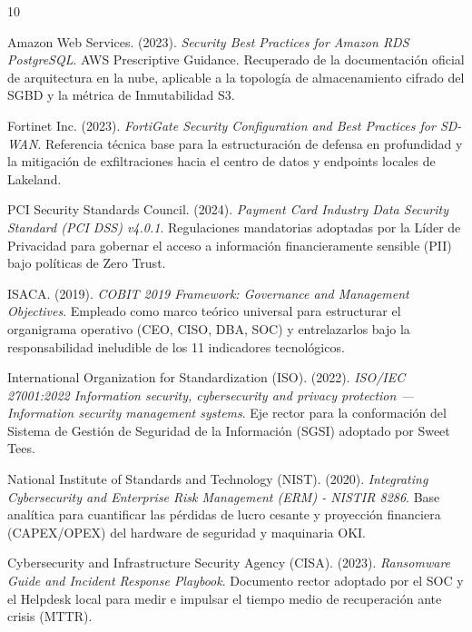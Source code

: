 \documentclass[11pt,a4paper]{article}
\begin{document}
\begin{thebibliography}{10}

Amazon Web Services. (2023). \textit{Security Best Practices for Amazon RDS PostgreSQL}. AWS Prescriptive Guidance. Recuperado de la documentación oficial de arquitectura en la nube, aplicable a la topología de almacenamiento cifrado del SGBD y la métrica de Inmutabilidad S3.

Fortinet Inc. (2023). \textit{FortiGate Security Configuration and Best Practices for SD-WAN}. Referencia técnica base para la estructuración de defensa en profundidad y la mitigación de exfiltraciones hacia el centro de datos y endpoints locales de Lakeland.

PCI Security Standards Council. (2024). \textit{Payment Card Industry Data Security Standard (PCI DSS) v4.0.1}. Regulaciones mandatorias adoptadas por la Líder de Privacidad para gobernar el acceso a información financieramente sensible (PII) bajo políticas de Zero Trust.

ISACA. (2019). \textit{COBIT 2019 Framework: Governance and Management Objectives}. Empleado como marco teórico universal para estructurar el organigrama operativo (CEO, CISO, DBA, SOC) y entrelazarlos bajo la responsabilidad ineludible de los 11 indicadores tecnológicos.

International Organization for Standardization (ISO). (2022). \textit{ISO/IEC 27001:2022 Information security, cybersecurity and privacy protection — Information security management systems}. Eje rector para la conformación del Sistema de Gestión de Seguridad de la Información (SGSI) adoptado por Sweet Tees.

National Institute of Standards and Technology (NIST). (2020). \textit{Integrating Cybersecurity and Enterprise Risk Management (ERM) - NISTIR 8286}. Base analítica para cuantificar las pérdidas de lucro cesante y proyección financiera (CAPEX/OPEX) del hardware de seguridad y maquinaria OKI.

Cybersecurity and Infrastructure Security Agency (CISA). (2023). \textit{Ransomware Guide and Incident Response Playbook}. Documento rector adoptado por el SOC y el Helpdesk local para medir e impulsar el tiempo medio de recuperación ante crisis (MTTR).

\end{thebibliography}
\end{document}
